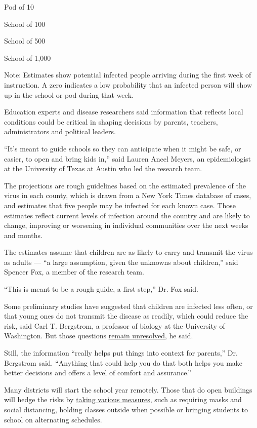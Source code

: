 Pod of 10

School of 100

School of 500

School of 1,000

Note: Estimates show potential infected people arriving during the first
week of instruction. A zero indicates a low probability that an infected
person will show up in the school or pod during that week.

Education experts and disease researchers said information that reflects
local conditions could be critical in shaping decisions by parents,
teachers, administrators and political leaders.

``It's meant to guide schools so they can anticipate when it might be
safe, or easier, to open and bring kids in,'' said Lauren Ancel Meyers,
an epidemiologist at the University of Texas at Austin who led the
research team.

The projections are rough guidelines based on the estimated prevalence
of the virus in each county, which is drawn from a New York Times
database of cases, and estimates that five people may be infected for
each known case. Those estimates reflect current levels of infection
around the country and are likely to change, improving or worsening in
individual communities over the next weeks and months.

The estimates assume that children are as likely to carry and transmit
the virus as adults --- ``a large assumption, given the unknowns about
children,'' said Spencer Fox, a member of the research team.

``This is meant to be a rough guide, a first step,'' Dr. Fox said.

Some preliminary studies have suggested that children are infected less
often, or that young ones do not transmit the disease as readily, which
could reduce the risk, said Carl T. Bergstrom, a professor of biology at
the University of Washington. But those questions
\href{https://www.nytimes3xbfgragh.onion/2020/07/30/health/coronavirus-children.html}{remain
unresolved}, he said.

Still, the information ``really helps put things into context for
parents,'' Dr. Bergstrom said. ``Anything that could help you do that
both helps you make better decisions and offers a level of comfort and
assurance.''

Many districts will start the school year remotely. Those that do open
buildings will hedge the risks by
\href{https://www.nytimes3xbfgragh.onion/interactive/2020/07/29/us/schools-reopening-coronavirus.html}{taking
various measures}, such as requiring masks and social distancing,
holding classes outside when possible or bringing students to school on
alternating schedules.

